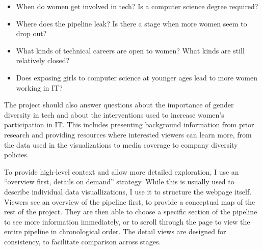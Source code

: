 \begin{itemize}
  \item When do women get involved in tech? Is a computer science degree required?
  \item Where does the pipeline leak? Is there a stage when more women seem to drop out?
  \item What kinds of technical careers are open to women? What kinds are still relatively closed?
  \item Does exposing girls to computer science at younger ages lead to more women working in IT\@?
\end{itemize}

The project should also answer questions about the importance of gender diversity in tech and about the interventions used to increase women's participation in IT\@. This includes presenting background information from prior research and providing resources where interested viewers can learn more, from the data used in the visualizations to media coverage to company diversity policies.

To provide high-level context and allow more detailed exploration, I use an ``overview first, details on demand'' strategy. While this is usually used to describe individual data visuallizations, I use it to structure the webpage itself. Viewers see an overview of the pipeline first, to provide a conceptual map of the rest of the project. They are then able to choose a specific section of the pipeline to see more information immediately, or to scroll through the page to view the entire pipeline in chronological order. The detail views are designed for consistency, to facilitate comparison across stages.
